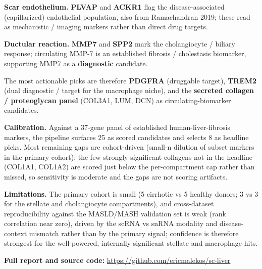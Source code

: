 \documentclass[
  10pt,
  letterpaper,
  DIV=11,
  numbers=noendperiod]{scrartcl}
\begin{document}
\textbf{Scar endothelium.} \textbf{PLVAP} and \textbf{ACKR1} flag the
disease-associated (capillarized) endothelial population, also from
Ramachandran 2019; these read as mechanistic / imaging markers rather
than direct drug targets.

\textbf{Ductular reaction.} \textbf{MMP7} and \textbf{SPP2} mark the
cholangiocyte / biliary response; circulating MMP-7 is an established
fibrosis / cholestasis biomarker, supporting MMP7 as a
\textbf{diagnostic} candidate.

The most actionable picks are therefore \textbf{PDGFRA} (druggable
target), \textbf{TREM2} (dual diagnostic / target for the macrophage
niche), and the \textbf{secreted collagen / proteoglycan panel} (COL3A1,
LUM, DCN) as circulating-biomarker candidates.

\textbf{Calibration.} Against a 37-gene panel of established
human-liver-fibrosis markers, the pipeline surfaces 25 as scored
candidates and selects 8 as headline picks. Most remaining gaps are
cohort-driven (small-n dilution of subset markers in the primary
cohort); the few strongly significant collagens not in the headline
(COL1A1, COL1A2) are scored just below the per-compartment cap rather
than missed, so sensitivity is moderate and the gaps are not scoring
artifacts.

\textbf{Limitations.} The primary cohort is small (5 cirrhotic vs 5
healthy donors; 3 vs 3 for the stellate and cholangiocyte compartments),
and cross-dataset reproducibility against the MASLD/MASH validation set
is weak (rank correlation near zero), driven by the scRNA vs snRNA
modality and disease-context mismatch rather than by the primary signal;
confidence is therefore strongest for the well-powered,
internally-significant stellate and macrophage hits.

\textbf{Full report and source code:}
\url{https://github.com/ericmalekos/sc-liver}
\end{document}
